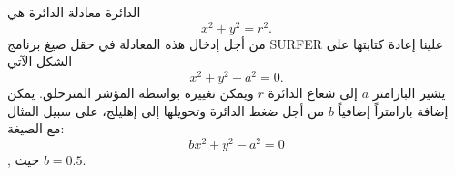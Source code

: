 \begin{surferPage}[Circle]{الدائرة}
معادلة الدائرة هي
\[x^2+y^2=r^2.\]
من أجل إدخال هذه المعادلة في حقل صيغ برنامج SURFER علينا إعادة كتابتها على الشكل الآتي
\[x^2+y^2-a^2=0.\]
يشير البارامتر $a$ إلى شعاع الدائرة $r$ ويمكن تغييره بواسطة المؤشر المتزحلق. يمكن إضافة بارامتراً إضافياً $ b $ من أجل ضغط الدائرة وتحويلها إلى إهليلج، على سبيل المثال مع الصيغة:
\[bx^2+y^2-a^2=0\], حيث $b=0.5$.
\end{surferPage}
